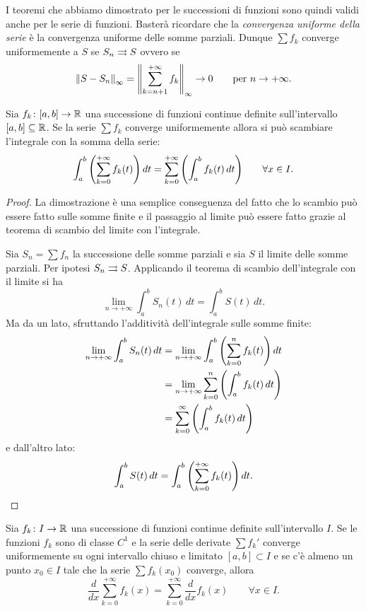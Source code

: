 I teoremi che abbiamo dimostrato per le successioni di funzioni sono quindi validi anche per le serie di funzioni. Basterà ricordare che la \emph{convergenza uniforme della serie}
%
%
%
 è la convergenza uniforme delle somme parziali. Dunque $\sum f_k$ converge uniformemente a $S$ se $S_n \rightrightarrows S$ ovvero se
\[
  {\left\Vert S - S_n\right\Vert}_\infty = {\left\Vert \sum_{k=n+1}^{+\infty} f_k\right\Vert}_\infty \to 0
  \qquad \text{per $n\to +\infty$.}
\]



\begin{theorem}
\label{th:integrale_serie}
\mymark{**}%
%
%
%
%
Sia $f_k\colon [a,b]\to{\mathbb R}$ una successione di funzioni continue definite sull'intervallo $[a,b]\subseteq {\mathbb R}$.
Se la serie $\sum f_k$ converge uniformemente
allora si può scambiare l'integrale con la somma della serie:
\[
  \int_a^b {\left( \sum_{k=0}^{+\infty} f_k(t) \right)}\, dt
  = \sum_{k=0}^{+\infty} {\left( \int_a^b f_k(t)\, dt \right)}
  \qquad \forall x \in I.
\]
\end{theorem}
\begin{proof}
\mymark{**}
La dimostrazione è una semplice conseguenza del fatto che lo scambio 
può essere fatto sulle somme finite e il passaggio al limite 
può essere fatto grazie al teorema di scambio del limite con l'integrale.

Sia $S_n = \sum f_n$ la successione delle somme parziali e sia $S$ 
il limite delle somme parziali. Per ipotesi $S_n\rightrightarrows S$. 
Applicando il teorema di scambio dell'integrale con il limite si ha
\[
  \lim_{n\to +\infty} \int_a^b S_n(t)\, dt = \int_a^b S(t)\, dt.
\]
Ma da un lato, sfruttando l'additività dell'integrale sulle somme finite:
\begin{align*}
  \lim_{n\to +\infty} \int_a^b S_n(t)\, dt
   &= \lim_{n\to+\infty}\int_a^b {\left( \sum_{k=0}^n f_k(t) \right)} \,  dt\\
   &= \lim_{n\to+\infty}\sum_{k=0}^n {\left( \int_a^b f_k(t)\, dt \right)}\\
   &= \sum_{k=0}^\infty {\left( \int_a^b f_k(t)\, dt \right)}
\end{align*}
e dall'altro lato:
\[
  \int_a^b S(t)\, dt = \int_a^b {\left( \sum_{k=0}^{+\infty} f_k(t) \right)}\, dt.
\]
\end{proof}

\begin{theorem}
\mymark{**}
Sia $f_k\colon I\to{\mathbb R}$ una successione di funzioni continue definite sull'intervallo $I$. 
Se le funzioni $f_k$ sono di classe $C^1$ e la serie delle derivate $\sum f_k'$ converge uniformemente
su ogni intervallo chiuso e limitato $[a,b]\subset I$
e se c'è almeno un punto $x_0\in I$ tale che la serie
$\sum f_k(x_0)$ converge, allora
\[
  \frac{d}{dx} \sum_{k=0}^{+\infty} f_k(x) = \sum_{k=0}^{+\infty} \frac{d}{dx}f_k(x)
  \qquad \forall x \in I.
\]
\end{theorem}

